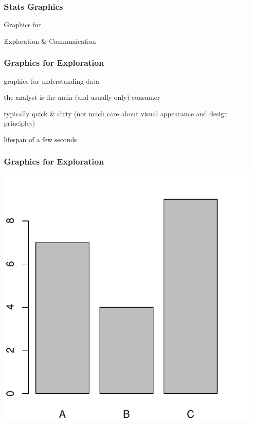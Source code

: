 \documentclass[12pt]{beamer}\usepackage[]{graphicx}\usepackage[]{color}
\newenvironment{knitrout}{}{} %
\begin{document}

\begin{frame}
\frametitle{Stats Graphics}

\centerline{\mdlit \Large Graphics for}

\bigskip
\centerline{\Large Exploration \quad \& \quad Communication}

\end{frame}


\begin{frame}
\frametitle{Graphics for Exploration}

\bbi
  \item graphics for understanding data
  \item the analyst is the main (and usually only) consumer
  \item typically quick \& dirty (not much care about visual appearance and design principles)
  \item lifespan of a few seconds
\ei

\end{frame}


\begin{frame}
\frametitle{Graphics for Exploration}

\begin{knitrout}\footnotesize
{}\color{fgcolor}

{\centering \includegraphics[width=.7\linewidth,height=.6\linewidth]{figure/unnamed-chunk-8-1} 

}



\end{knitrout}

\end{frame}
\end{document}
